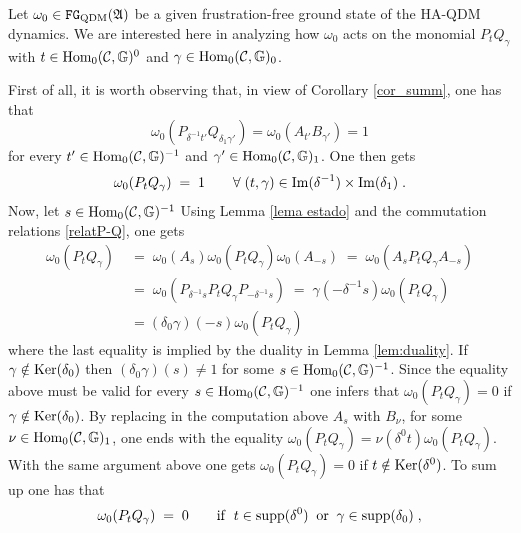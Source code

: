 \documentclass[a4paper,12pt,twoside,reqno]{amsart}
\theoremstyle{plain}
\theoremstyle{definition}
\theoremstyle{remark}
\numberwithin{equation}{section}
\numberwithin{figure}{section}
\numberwithin{table}{section}
\newcommand{\f}[1]{\mathcal{#1}}
\newcommand{\n}[1]{\mathbb{#1}}
\begin{document}
	
	
	
	
	\medskip
	
	
	
	
	Let $\omega_0\in \mathtt{FG}_{\rm QDM}(\mathfrak{A})$ be a given frustration-free ground state of the  {HA-QDM dynamics}. We are interested here in analyzing how $\omega_0$ acts on the monomial
	$P_tQ_\gamma$
	with $t\in {\rm Hom}_0(\f{C},\n{G})^0$ and $\gamma\in {\rm Hom}_0(\f{C},\n{G})_0$.
	
	\medskip  
	
	First of all, it is worth observing that, in view of Corollary \ref{cor_summ}, one has that
	\[
	\omega_0(P_{\delta^{-1}t'}Q_{\delta_1\gamma'})=\omega_0(A_{t'}B_{\gamma'})=1
	\]
	for every $t'\in {\rm Hom}_0(\f{C},\n{G})^{-1}$ and $\gamma'\in {\rm Hom}_0(\f{C},\n{G})_1$. One then gets
	\begin{equation}
		\omega_0(P_{t}Q_{\gamma})\;=\;1 \qquad \forall \;(t,\gamma)\in {\rm Im}{(\delta^{-1})}\times  {\rm Im}{(\delta_{1})}\;.
	\end{equation}
	Now, let $s\in {\rm Hom}_0(\f{C},\n{G})^{-1}$
	Using Lemma \ref{lema estado} and the commutation relations \eqref{relatP-Q}, one  gets
	\begin{align*}
		\omega_0(P_tQ_\gamma)\;&=\;\omega_0(A_s)\omega_0(P_tQ_\gamma)\omega_0(A_{-s})    \;=\;\omega_0(A_s P_t Q_\gamma A_{-s})\\
		&=\;\omega_0(P_{\delta^{-1}s} P_t Q_\gamma P_{-\delta^{-1}s})\;=\;\gamma(-\delta^{-1}s)\omega_0(P_tQ_\gamma)\\
		&=(\delta_0\gamma)(-s)\omega_0(P_tQ_\gamma)
	\end{align*}
	where the last equality is implied by the duality in Lemma \ref{lem:duality}. If $\gamma\notin {\rm Ker}(\delta_0)$
	then $(\delta_0\gamma)(s)\neq 1$ for some $s\in {\rm Hom}_0(\f{C},\n{G})^{-1}$. Since the equality above must be valid for every $s\in {\rm Hom}_0(\f{C},\n{G})^{-1}$ one infers that $\omega_0(P_{t}Q_{\gamma})=0$ if $\gamma\notin {\rm Ker}(\delta_0)$.
	By replacing in the computation above $A_s$ with $B_\nu$, for some $\nu\in {\rm Hom}_0(\f{C},\n{G})_{1}$,  one ends with the equality
	$\omega_0(P_tQ_\gamma)=\nu(\delta^0t)\omega_0(P_tQ_\gamma)$.
	With the same argument above one gets $\omega_0(P_{t}Q_{\gamma})=0$ if $t\notin {\rm Ker}(\delta^0)$. To sum up one has that
	\begin{equation}
		\omega_0(P_{t}Q_{\gamma})\;=\;0 \qquad {\rm if}\; \; t\in{\rm supp}(\delta^0)\;\;\text{or}\;\;
		\gamma\in{\rm supp}(\delta_0)\;,
	\end{equation}
\end{document}
